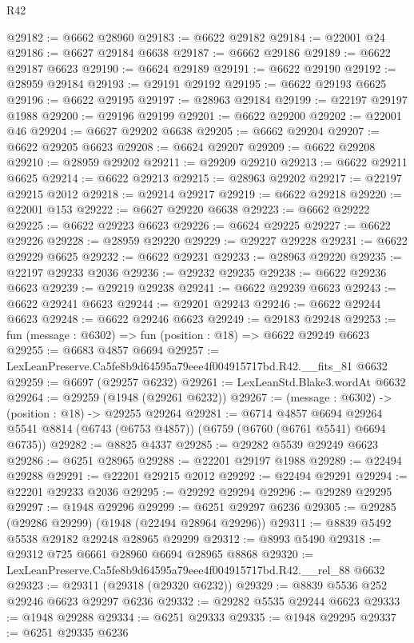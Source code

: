 \begin{lexlean}{R42}
\begin{coremodule}
{@29182 := @6662 @28960
@29183 := @6622 @29182
@29184 := @22001 @24
@29186 := @6627 @29184 @6638
@29187 := @6662 @29186
@29189 := @6622 @29187 @6623
@29190 := @6624 @29189
@29191 := @6622 @29190
@29192 := @28959 @29184
@29193 := @29191 @29192
@29195 := @6622 @29193 @6625
@29196 := @6622 @29195
@29197 := @28963 @29184
@29199 := @22197 @29197 @1988
@29200 := @29196 @29199
@29201 := @6622 @29200
@29202 := @22001 @46
@29204 := @6627 @29202 @6638
@29205 := @6662 @29204
@29207 := @6622 @29205 @6623
@29208 := @6624 @29207
@29209 := @6622 @29208
@29210 := @28959 @29202
@29211 := @29209 @29210
@29213 := @6622 @29211 @6625
@29214 := @6622 @29213
@29215 := @28963 @29202
@29217 := @22197 @29215 @2012
@29218 := @29214 @29217
@29219 := @6622 @29218
@29220 := @22001 @153
@29222 := @6627 @29220 @6638
@29223 := @6662 @29222
@29225 := @6622 @29223 @6623
@29226 := @6624 @29225
@29227 := @6622 @29226
@29228 := @28959 @29220
@29229 := @29227 @29228
@29231 := @6622 @29229 @6625
@29232 := @6622 @29231
@29233 := @28963 @29220
@29235 := @22197 @29233 @2036
@29236 := @29232 @29235
@29238 := @6622 @29236 @6623
@29239 := @29219 @29238
@29241 := @6622 @29239 @6623
@29243 := @6622 @29241 @6623
@29244 := @29201 @29243
@29246 := @6622 @29244 @6623
@29248 := @6622 @29246 @6623
@29249 := @29183 @29248
@29253 := fun (message : @6302) => fun (position : @18) => @6622 @29249 @6623
@29255 := @6683 @4857 @6694
@29257 := LexLeanPreserve.Ca5fe8b9d64595a79eee4f004915717bd.R42.__fits_81 @6632
@29259 := @6697 (@29257 @6232)
@29261 := LexLeanStd.Blake3.wordAt @6632
@29264 := @29259 (@1948 (@29261 @6232))
@29267 := (message : @6302) -> (position : @18) -> @29255 @29264
@29281 := @6714
    @4857
    @6694
    @29264
    @5541
    @8814
    (@6743 (@6753 @4857))
    (@6759 (@6760 (@6761 @5541) @6694 @6735))
@29282 := @8825 @4337
@29285 := @29282 @5539 @29249 @6623
@29286 := @6251 @28965
@29288 := @22201 @29197 @1988
@29289 := @22494 @29288
@29291 := @22201 @29215 @2012
@29292 := @22494 @29291
@29294 := @22201 @29233 @2036
@29295 := @29292 @29294
@29296 := @29289 @29295
@29297 := @1948 @29296
@29299 := @6251 @29297 @6236
@29305 := @29285 (@29286 @29299) (@1948 (@22494 @28964 @29296))
@29311 := @8839 @5492 @5538 @29182 @29248 @28965 @29299
@29312 := @8993 @5490
@29318 := @29312 @725 @6661 @28960 @6694 @28965 @8868
@29320 := LexLeanPreserve.Ca5fe8b9d64595a79eee4f004915717bd.R42.__rel_88 @6632
@29323 := @29311 (@29318 (@29320 @6232))
@29329 := @8839 @5536 @252 @29246 @6623 @29297 @6236
@29332 := @29282 @5535 @29244 @6623
@29333 := @1948 @29288
@29334 := @6251 @29333
@29335 := @1948 @29295
@29337 := @6251 @29335 @6236
}
\end{coremodule}
\end{lexlean}
